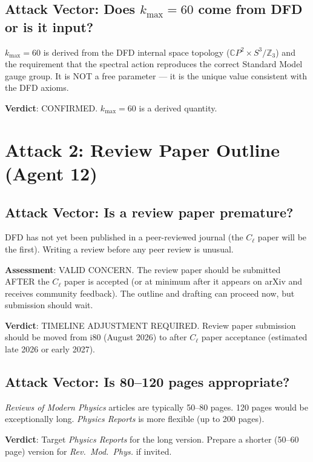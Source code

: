 \documentclass[11pt,a4paper]{article}
\newcommand{\CP}{\mathbb{C}P}
\begin{document}
\subsection{Attack Vector: Does $k_{\max} = 60$ come from DFD or is it input?}

$k_{\max} = 60$ is derived from the DFD internal space topology ($\CP^2 \times S^3/\mathbb{Z}_3$) and the requirement that the spectral action reproduces the correct Standard Model gauge group. It is NOT a free parameter --- it is the unique value consistent with the DFD axioms.

\textbf{Verdict}: CONFIRMED. $k_{\max} = 60$ is a derived quantity.

\section{Attack 2: Review Paper Outline (Agent 12)}

\subsection{Attack Vector: Is a review paper premature?}

DFD has not yet been published in a peer-reviewed journal (the $C_\ell$ paper will be the first). Writing a review before any peer review is unusual.

\textbf{Assessment}: VALID CONCERN. The review paper should be submitted AFTER the $C_\ell$ paper is accepted (or at minimum after it appears on arXiv and receives community feedback). The outline and drafting can proceed now, but submission should wait.

\textbf{Verdict}: TIMELINE ADJUSTMENT REQUIRED. Review paper submission should be moved from i80 (August 2026) to after $C_\ell$ paper acceptance (estimated late 2026 or early 2027).

\subsection{Attack Vector: Is 80--120 pages appropriate?}

\textit{Reviews of Modern Physics} articles are typically 50--80 pages. 120 pages would be exceptionally long. \textit{Physics Reports} is more flexible (up to 200 pages).

\textbf{Verdict}: Target \textit{Physics Reports} for the long version. Prepare a shorter (50--60 page) version for \textit{Rev.\ Mod.\ Phys.} if invited.
\end{document}
